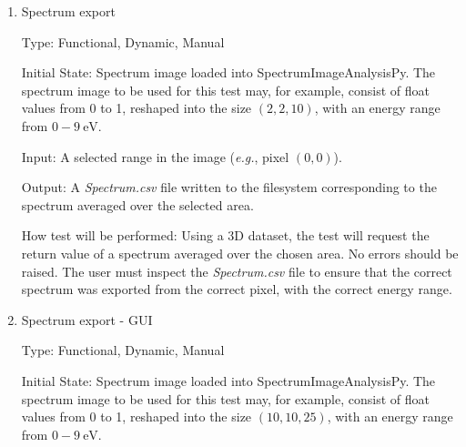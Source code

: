 \documentclass[12pt, titlepage]{article}
\newcommand{\progname}{SpectrumImageAnalysisPy}
\begin{document}
\begin{enumerate}
Type: Functional, Dynamic, Manual

Initial State: Spectrum image loaded into \progname{}. The spectrum image to be
used for this test may, for example, consist of float values from 0 to 1,
reshaped into the size $(10,10,25)$, with an energy range from $0-9\
\si{\electronvolt}$.

Input: The user must interact with the GUI to select an energy range in the
spectrum from which to create and export an image.

Output: An \textit{Image.png} image written to the filesystem corresponding to
the image averaged over the selected spectrum energy range.

How test will be performed: Using a 3D dataset, the test will display the GUI
and ask the user to select an energy range in the spectrum and run the command
to export an image to file. The user must inspect the \textit{Image.png} file to
ensure that the correct image was exported from the correct pixel.\\

\item{Spectrum export}
\label{TFR:SpecExport}

Type: Functional, Dynamic, Manual

Initial State: Spectrum image loaded into \progname{}. The spectrum image to be
used for this test may, for example, consist of float values from 0 to 1,
reshaped into the size $(2,2,10)$, with an energy range from $0-9\
\si{\electronvolt}$.

Input: A selected range in the image (\textit{e.g.}, pixel $(0,0)$).

Output: A \textit{Spectrum.csv} file written to the filesystem corresponding to
the spectrum averaged over the selected area.

How test will be performed: Using a 3D dataset, the test will request the return
value of a spectrum averaged over the chosen area. No errors should be raised.
The user must inspect the \textit{Spectrum.csv} file to ensure that the correct
spectrum was exported from the correct pixel, with the correct energy range.

\item{Spectrum export - GUI}
\label{TFR:SpecExportGUI}

Type: Functional, Dynamic, Manual

Initial State: Spectrum image loaded into \progname{}. The spectrum image to be
used for this test may, for example, consist of float values from 0 to 1,
reshaped into the size $(10,10,25)$, with an energy range from $0-9\
\si{\electronvolt}$.


\end{enumerate}
\end{document}
